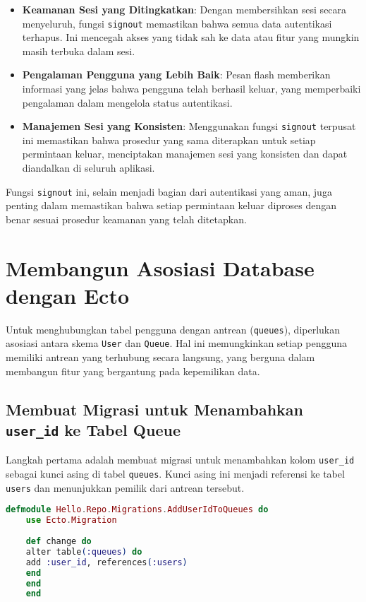 \begin{itemize}
	\item \textbf{Keamanan Sesi yang Ditingkatkan}: Dengan membersihkan sesi secara menyeluruh, fungsi \texttt{signout} memastikan bahwa semua data autentikasi terhapus. Ini mencegah akses yang tidak sah ke data atau fitur yang mungkin masih terbuka dalam sesi.
	\item \textbf{Pengalaman Pengguna yang Lebih Baik}: Pesan flash memberikan informasi yang jelas bahwa pengguna telah berhasil keluar, yang memperbaiki pengalaman dalam mengelola status autentikasi.
	\item \textbf{Manajemen Sesi yang Konsisten}: Menggunakan fungsi \texttt{signout} terpusat ini memastikan bahwa prosedur yang sama diterapkan untuk setiap permintaan keluar, menciptakan manajemen sesi yang konsisten dan dapat diandalkan di seluruh aplikasi.
\end{itemize}

Fungsi \texttt{signout} ini, selain menjadi bagian dari autentikasi yang aman, juga penting dalam memastikan bahwa setiap permintaan keluar diproses dengan benar sesuai prosedur keamanan yang telah ditetapkan.


\section{Membangun Asosiasi Database dengan Ecto}
Untuk menghubungkan tabel pengguna dengan antrean (\texttt{queues}), diperlukan asosiasi antara skema \texttt{User} dan \texttt{Queue}. Hal ini memungkinkan setiap pengguna memiliki antrean yang terhubung secara langsung, yang berguna dalam membangun fitur yang bergantung pada kepemilikan data.

\subsection{Membuat Migrasi untuk Menambahkan \texttt{user\_id} ke Tabel Queue}
Langkah pertama adalah membuat migrasi untuk menambahkan kolom \texttt{user\_id} sebagai kunci asing di tabel \texttt{queues}. Kunci asing ini menjadi referensi ke tabel \texttt{users} dan menunjukkan pemilik dari antrean tersebut.

\begin{lstlisting}[language=Elixir, caption={\texttt{ecto mix.gen.migration add\_user\_id\_to\_queues}}]
	defmodule Hello.Repo.Migrations.AddUserIdToQueues do
	use Ecto.Migration
	
	def change do
	alter table(:queues) do
	add :user_id, references(:users)
	end
	end
	end
\end{lstlisting}

